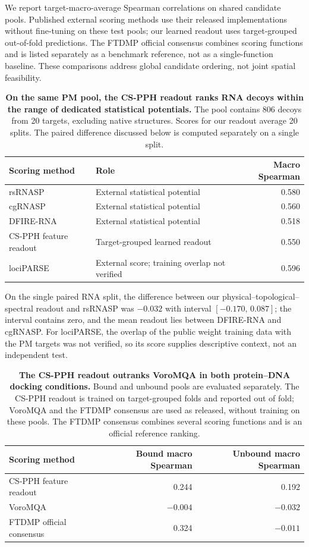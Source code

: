 \documentclass[11pt]{article}
\begin{document}
We report target-macro-average Spearman correlations on shared candidate pools. Published external scoring methods use their released implementations without fine-tuning on these test pools; our learned readout uses target-grouped out-of-fold predictions. The FTDMP official consensus combines scoring functions and is listed separately as a benchmark reference, not as a single-function baseline. These comparisons address global candidate ordering, not joint spatial feasibility.

\begin{table}[htbp]
\centering
\caption{\textbf{On the same PM pool, the CS-PPH readout ranks RNA decoys within the range of dedicated statistical potentials.} The pool contains 806 decoys from 20 targets, excluding native structures. Scores for our readout average 20 splits. The paired difference discussed below is computed separately on a single split.}
\label{tab:rna}
\begin{tabular}{@{}llr@{}}
\toprule
Scoring method & Role & Macro Spearman \\
\midrule
rsRNASP\citep{rsrnasp} & External statistical potential & 0.580 \\
cgRNASP\citep{cgrnasp} & External statistical potential & 0.560 \\
DFIRE-RNA\citep{dfirerna} & External statistical potential & 0.518 \\
CS-PPH feature readout & Target-grouped learned readout & 0.550 \\
lociPARSE\citep{lociparse} & External score; training overlap not verified & 0.596 \\
\bottomrule
\end{tabular}
\end{table}

On the single paired RNA split, the difference between our physical--topological--spectral readout and rsRNASP was $-0.032$ with interval $[-0.170,\,0.087]$; the interval contains zero, and the mean readout lies between DFIRE-RNA and cgRNASP. For lociPARSE, the overlap of the public weight training data with the PM targets was not verified, so its score supplies descriptive context, not an independent test.

\begin{table}[htbp]
\centering
\caption{\textbf{The CS-PPH readout outranks VoroMQA in both protein--DNA docking conditions.} Bound and unbound pools are evaluated separately. The CS-PPH readout is trained on target-grouped folds and reported out of fold; VoroMQA and the FTDMP consensus are used as released, without training on these pools. The FTDMP consensus combines several scoring functions and is an official reference ranking.}
\label{tab:pd}
\begin{tabular}{@{}lrr@{}}
\toprule
Scoring method & Bound macro Spearman & Unbound macro Spearman \\
\midrule
CS-PPH feature readout & 0.244 & 0.192 \\
VoroMQA\citep{voromqa} & $-0.004$ & $-0.032$ \\
FTDMP official consensus\citep{ftdmpdata} & 0.324 & $-0.011$ \\
\bottomrule
\end{tabular}
\end{table}
\end{document}
